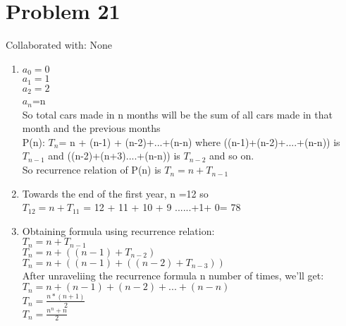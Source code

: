 \documentclass{article}
\begin{document}
\section{Problem 21}
Collaborated with: None\\
\begin{enumerate}
\item %
$a_{0}=0$\\
$a_{1}=1$\\
$a_{2}=2$\\
$a_{n}$=n\\
So total cars made in n months will be the sum of all cars made in that month and the previous months \\
P(n): $T_{n}$= n + (n-1) + (n-2)+...+(n-n) where ((n-1)+(n-2)+....+(n-n)) is $T_{n-1}$ and ((n-2)+(n+3)....+(n-n)) is $T_{n-2}$ and so on.\\
So recurrence relation of P(n) is $ T_{n}=n+T_{n-1}$\\
\item %
Towards the end of the first year, n =12 so \\$T_{12}= n + T_{11}$ = 12 + 11 + 10 + 9 ......+1+ 0= 78\\
\item %
Obtaining formula using recurrence relation:\\
$ T_{n}=n+T_{n-1}$\\
$ T_{n}=n+((n-1) + T_{n-2})$\\
$ T_{n}=n+((n-1) + ((n-2) + T_{n-3}))$\\
After unraveliing the recurrence formula n number of times, we'll get: \\
$ T_{n}=n+(n-1)+(n-2)+...+(n-n)$\\
$ T_{n}=\frac{n*(n+1)}{2}$\\
$ T_{n}=\frac{n^{n}+n}{2}$\\
\end{enumerate}
\end{document}

